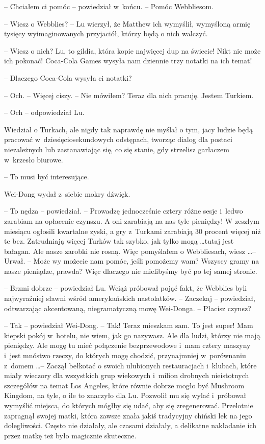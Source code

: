 \documentclass[oneside,polish,11pt,rmheadings]{mwbk}
\begin{document}
 -- Chciałem ci pomóc -- powiedział w~końcu. -- Pomóc Webbliesom.

-- Wiesz o Webblies? -- Lu wierzył, że Matthew ich wymyślił, wymyśloną armię tysięcy wyimaginowanych przyjaciół, którzy będą o nich walczyć.

-- Wiesz o nich? Lu, to gildia, która kopie najwięcej dup na świecie! Nikt nie może ich pokonać! Coca-Cola Games wysyła nam dziennie trzy notatki na ich temat!

-- Dlaczego Coca-Cola wysyła ci notatki? 

-- Och. -- Więcej ciszy. -- Nie mówiłem? Teraz dla nich pracuję. Jestem Turkiem.

-- Och -- odpowiedział Lu. 

Wiedział o Turkach, ale nigdy tak naprawdę nie myślał o tym, jacy ludzie będą pracować w~dziesięciosekundowych odstępach, tworząc dialog dla postaci niezależnych lub zastanawiając się, co się stanie, gdy strzelisz garłaczem w~krzesło biurowe. 

-- To musi być interesujące.

Wei-Dong wydał z~siebie mokry dźwięk. 

-- To nędza -- powiedział. -- Prowadzę jednocześnie cztery różne sesje i~ledwo zarabiam na opłacenie czynszu. A oni zarabiają na nas tyle pieniędzy! W zeszłym miesiącu ogłosili kwartalne zyski, a gry z~Turkami zarabiają 30 procent więcej niż te bez. Zatrudniają więcej Turków tak szybko, jak tylko mogą \ldots  tutaj jest bałagan. Ale nasze zarobki nie rosną. Więc pomyślałem o Webbliesach, wiesz \ldots  -- Urwał. -- Może wy możecie nam pomóc, jeśli pomożemy wam? Wszyscy gramy na nasze pieniądze, prawda? Więc dlaczego nie mielibyśmy być po tej samej stronie.

-- Brzmi dobrze -- powiedział Lu. Wciąż próbował pojąć fakt, że Webblies byli najwyraźniej sławni wśród amerykańskich nastolatków. -- Zaczekaj -- powiedział, odtwarzając akcentowaną, niegramatyczną mowę Wei-Donga. -- Płacisz czynsz?

-- Tak -- powiedział Wei-Dong. -- Tak! Teraz mieszkam sam. To jest super! Mam kiepski pokój w~hotelu, nie wiem, jak go nazywasz. Ale dla ludzi, którzy nie mają pieniędzy. Ale mogę tu mieć połączenie bezprzewodowe i~mam cztery maszyny i~jest mnóstwo rzeczy, do których mogę chodzić, przynajmniej w~porównaniu z~domem \ldots  -- Zaczął bełkotać o swoich ulubionych restauracjach i~klubach, które miały wieczory dla wszystkich grup wiekowych i~milion drobnych nieistotnych szczegółów na temat Los Angeles, które równie dobrze mogło być Mushroom Kingdom, na tyle, o ile to znaczyło dla Lu. Pozwolił mu się wylać i~próbował wymyślić miejsca, do których mógłby się udać, aby się zregenerować. Przelotnie zapragnął swojej matki, która zawsze znała jakiś tradycyjny chiński lek na jego dolegliwości. Często nie działały, ale czasami działały, a delikatne nakładanie ich przez matkę też było magicznie skuteczne.
\end{document}
